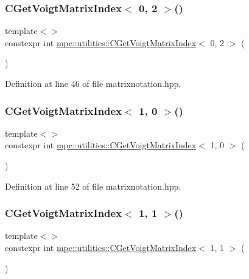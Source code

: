 \subsubsection{\texorpdfstring{C\+Get\+Voigt\+Matrix\+Index$<$ 0, 2 $>$()}{CGetVoigtMatrixIndex< 0, 2 >()}}
{\footnotesize\ttfamily template$<$$>$ \\
constexpr int \mbox{\hyperlink{namespacempc_1_1utilities_ad2c3679a8e007d8b5a333490886ef19d}{mpc\+::utilities\+::\+C\+Get\+Voigt\+Matrix\+Index}}$<$ 0, 2 $>$ (\begin{DoxyParamCaption}{ }\end{DoxyParamCaption})\hspace{0.3cm}{\ttfamily [inline]}}



Definition at line 46 of file matrixnotation.\+hpp.

\mbox{\label{namespacempc_1_1utilities_abb39f4caf6929d77f9e58a54820e7dbb}} 
\subsubsection{\texorpdfstring{C\+Get\+Voigt\+Matrix\+Index$<$ 1, 0 $>$()}{CGetVoigtMatrixIndex< 1, 0 >()}}
{\footnotesize\ttfamily template$<$$>$ \\
constexpr int \mbox{\hyperlink{namespacempc_1_1utilities_ad2c3679a8e007d8b5a333490886ef19d}{mpc\+::utilities\+::\+C\+Get\+Voigt\+Matrix\+Index}}$<$ 1, 0 $>$ (\begin{DoxyParamCaption}{ }\end{DoxyParamCaption})\hspace{0.3cm}{\ttfamily [inline]}}



Definition at line 52 of file matrixnotation.\+hpp.

\mbox{\label{namespacempc_1_1utilities_ac1968a4d83d920187abe3b8ea87d1262}} 
\subsubsection{\texorpdfstring{C\+Get\+Voigt\+Matrix\+Index$<$ 1, 1 $>$()}{CGetVoigtMatrixIndex< 1, 1 >()}}
{\footnotesize\ttfamily template$<$$>$ \\
constexpr int \mbox{\hyperlink{namespacempc_1_1utilities_ad2c3679a8e007d8b5a333490886ef19d}{mpc\+::utilities\+::\+C\+Get\+Voigt\+Matrix\+Index}}$<$ 1, 1 $>$ (\begin{DoxyParamCaption}{ }\end{DoxyParamCaption})\hspace{0.3cm}{\ttfamily [inline]}}



